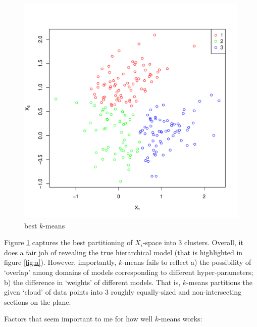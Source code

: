 \documentclass[a4paper,12pt,twoside]{article}
\begin{document}
\begin{figure}[ht]
\begin{minipage}[t]{0.45\linewidth}
            \includegraphics[width = \textwidth, keepaspectratio]{best_k_means.pdf}
                        \caption{best $k$-means}
            \label{fig:b}
        \end{minipage}
\end{figure}

Figure \ref{fig:b} captures the best partitioning of $X_i$-space into 3 clusters. Overall, it does a fair job of revealing the true hierarchical model (that is highlighted in figure \ref{fig:a}). However, importantly,  $k$-means fails to reflect a) the possibility of `overlap' among domains of models corresponding to different hyper-parameters; b) the difference in `weights' of different models. That is, $k$-means partitions the given `cloud' of data points into $3$ roughly equally-sized and non-intersecting sections on the plane.

Factors that seem important to me for how well $k$-means works:
\end{document}
